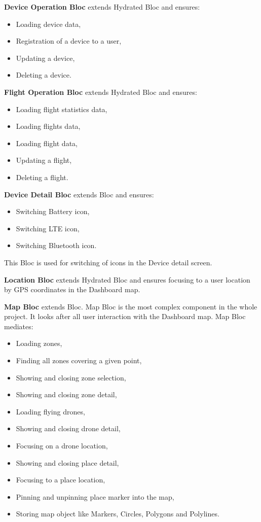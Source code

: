 \textbf{Device Operation Bloc} extends Hydrated Bloc and ensures:
\begin{itemize}
    \item Loading device data,
    \item Registration of a device to a user,
    \item Updating a device,
    \item Deleting a device.
\end{itemize}
\textbf{Flight Operation Bloc} extends Hydrated Bloc and ensures:
\begin{itemize}
    \item Loading flight statistics data,
    \item Loading flights data,
    \item Loading flight data,
    \item Updating a flight,
    \item Deleting a flight.
\end{itemize}
\textbf{Device Detail Bloc} extends Bloc and ensures:
\begin{itemize}
    \item Switching Battery icon,
    \item Switching LTE icon,
    \item Switching Bluetooth icon.
\end{itemize}
This Bloc is used for switching of icons in the Device detail screen.

\textbf{Location Bloc} extends Hydrated Bloc and ensures focusing to a user location by GPS coordinates in the Dashboard map.

\textbf{Map Bloc} extends Bloc.
Map Bloc is the most complex component in the whole project.
It looks after all user interaction with the Dashboard map.
Map Bloc mediates:
\begin{itemize}
    \item Loading zones,
    \item Finding all zones covering a given point,
    \item Showing and closing zone selection,
    \item Showing and closing zone detail,
    \item Loading flying drones,
    \item Showing and closing drone detail,
    \item Focusing on a drone location,
    \item Showing and closing place detail,
    \item Focusing to a place location,
    \item Pinning and unpinning place marker into the map,
    \item Storing map object like Markers, Circles, Polygons and Polylines.
\end{itemize}

